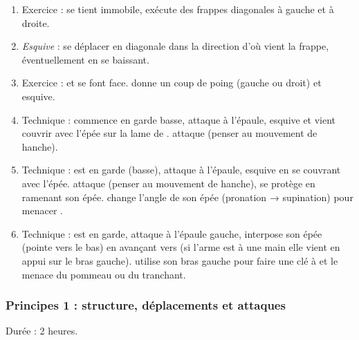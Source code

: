 \begin{enumerate}
	\item Exercice : \D se tient immobile, \A exécute des frappes diagonales à gauche et à droite.
	
	\item \emph{Esquive} : se déplacer en diagonale dans la direction d'où vient la frappe, éventuellement en se baissant.

	\item Exercice : \A et \D se font face.
		\A donne un coup de poing (gauche ou droit) et \D esquive.
	
	\item Technique : \D commence en garde basse, \A attaque à l'épaule, \D esquive et vient couvrir avec l'épée sur la lame de \A.
	\D attaque \A (penser au mouvement de hanche).
	
	\item Technique : \D est en garde (basse), \A attaque à l'épaule, \D esquive en se couvrant avec l'épée.
	\D attaque \A (penser au mouvement de hanche), \A se protège en ramenant son épée.
	\D change l'angle de son épée (pronation → supination) pour menacer \A.
	
	\item Technique : \D est en garde, \A attaque à l'épaule gauche, \D interpose son épée (pointe vers le bas) en avançant vers \A (si l'arme est à une main elle vient en appui sur le bras gauche).
	\D utilise son bras gauche pour faire une clé à \A et le menace du pommeau ou du tranchant.
\end{enumerate}



\subsubsection{Principes 1 : structure, déplacements et attaques}


Durée : 2 heures.


